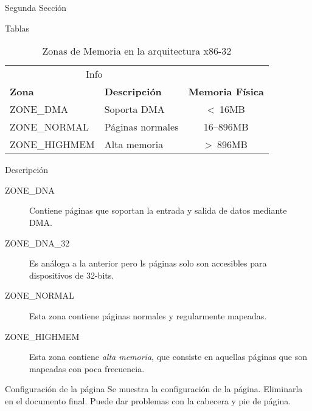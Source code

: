 \documentclass{article}
\theoremstyle{plain}
\theoremstyle{definition}
\begin{document}
\begin{section}{Segunda Sección}

\begin{subsection}{Tablas}

\lipsum[5]

\begin{table}[ht]
\caption{Zonas de Memoria en la arquitectura x86-32}
\kern 1mm                                  %
\centering \begin{tabular}{@{}llc@{}}
\toprule
\multicolumn{2}{c}{Info}                                            \\
\cmidrule(r){1-2}
\textbf{Zona} & \textbf{Descripción}   & \textbf{Memoria Física}    \\ 
\midrule
ZONE\_DMA     & Soporta DMA            & \textless \ 16MB           \\ 
ZONE\_NORMAL  & Páginas normales       & 16–896MB                   \\
ZONE\_HIGHMEM & Alta memoria           & \textgreater \ 896MB       \\ 
\bottomrule
\end{tabular}
\label{table:memoria-x86-32}
\end{table}

\end{subsection}

\begin{subsection}{Descripción}

\begin{description}
\item[ZONE\_DNA] Contiene páginas que soportan la entrada y salida de datos mediante DMA.
\item[ZONE\_DNA\_32] Es análoga a la anterior pero ls páginas solo son accesibles para
dispositivos de 32-bits.
\item[ZONE\_NORMAL] Esta zona contiene páginas normales y regularmente mapeadas.
\item[ZONE\_HIGHMEM] Esta zona contiene \textit{alta memoria}, que consiste en
 aquellas páginas que son mapeadas con poca frecuencia.
\end{description}

\end{subsection}

\pagebreak

\begin{subsection}{Configuración de la página}
Se muestra la configuración de la página. Eliminarla en el documento final. 
Puede dar problemas con la cabecera y pie de página.

\centering\layout
\end{subsection}

\end{section}
\end{document}
